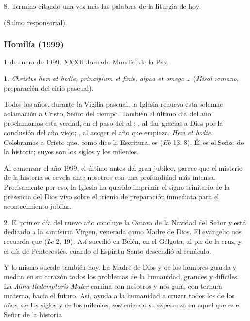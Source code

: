 8. Termino citando una vez más las palabras de la liturgia de hoy:

 (Salmo responsorial).



\subsubsection{Homilía (1999)}

1 de enero de 1999. XXXII Jornada Mundial de la Paz.


1. \emph{Christus heri et hodie, principium et finis, alpha et omega} \ldots{}  (\emph{Misal romano}, preparación del cirio pascual).

Todos los años, durante la Vigilia pascual, la Iglesia renueva esta solemne aclamación a Cristo, Señor del tiempo. También el último día del año proclamamos esta verdad, en el paso del  al : , al dar gracias a Dios por la conclusión del año viejo; , al acoger el año que empieza. \emph{Heri et hodie}. Celebramos a Cristo que, como dice la Escritura, es  (\emph{Hb} 13, 8). Él es el Señor de la historia; suyos son los siglos y los milenios.

Al comenzar el año 1999, el último antes del gran jubileo, parece que el misterio de la historia se revela ante nosotros con una profundidad más intensa. Precisamente por eso, la Iglesia ha querido imprimir el signo trinitario de la presencia del Dios vivo sobre el trienio de preparación inmediata para el acontecimiento jubilar.

2. El primer día del nuevo año concluye la Octava de la Navidad del Señor y está dedicado a la santísima Virgen, venerada como Madre de Dios. El evangelio nos recuerda que  (\emph{Lc} 2, 19). Así sucedió en Belén, en el Gólgota, al pie de la cruz, y el día de Pentecostés, cuando el Espíritu Santo descendió al cenáculo.

Y lo mismo sucede también hoy. La Madre de Dios y de los hombres guarda y medita en su corazón todos los problemas de la humanidad, grandes y difíciles. La \emph{Alma Redemptoris Mater} camina con nosotros y nos guía, con ternura materna, hacia el futuro. Así, ayuda a la humanidad a cruzar todos los  de los años, de los siglos y de los milenios, sosteniendo su esperanza en aquel que es el Señor de la historia

